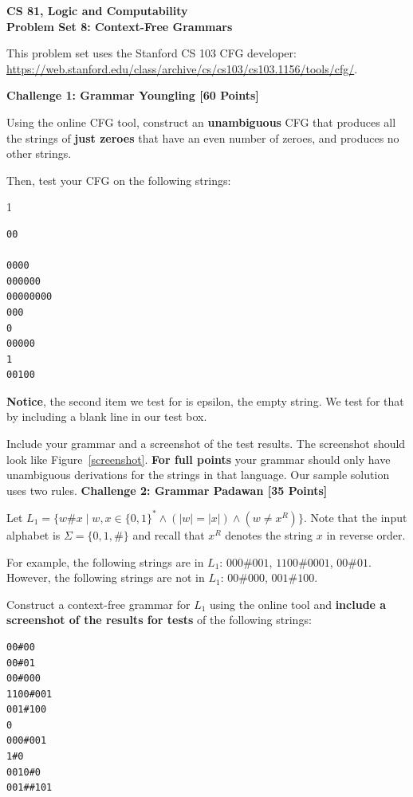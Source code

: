 \documentclass[11pt]{article}
\newcommand{\Problem}[3]{\mbox{} \newline \noindent \textbf{\textbf{Challenge #1: #2 [#3 Points] \\ }}}
\begin{document}
\begin{center}
	\bf
	CS 81, Logic and Computability \\
	Problem Set 8: Context-Free Grammars \\
\end{center}

This problem set uses the Stanford CS 103 CFG developer:\\
\href{https://web.stanford.edu/class/archive/cs/cs103/cs103.1156/tools/cfg/}{https://web.stanford.edu/class/archive/cs/cs103/cs103.1156/tools/cfg/}.

\Problem{1}{Grammar Youngling}{60}

Using the online CFG tool, construct an \textbf{unambiguous} CFG that produces all the strings of \textbf{just zeroes} that have an even number of zeroes, and produces no other strings.

Then, test your CFG on the following strings:
\begin{tcolorbox}1
\begin{verbatim}
00

0000
000000
00000000
000
0
00000
1
00100
\end{verbatim}
\end{tcolorbox}
\textbf{Notice}, the second item we test for is epsilon, the empty string. We test for that by including a blank line in our test box.

Include your grammar and a screenshot of the test results. The screenshot should look like Figure~\ref{screenshot}.
\textbf{For full points} your grammar should only have unambiguous derivations for the strings in that language. Our sample solution uses two rules.
\Problem{2}{Grammar Padawan}{35}

Let $L_1 = \{ w\# x \mid w, x \in \{0, 1\}^* \wedge  (|w| = |x|) \wedge (w \neq x^R) \}$.  Note that the input alphabet is $\Sigma = \{0, 1, \#\}$ and recall that $x^R$ denotes the string $x$ in reverse order.

For example, the following strings are in $L_1$:  $000\#001$, $1100\#0001$, $00\#01$.  However, the following strings are not in $L_1$:  $00\#000$, $001\#100$. 

Construct a context-free grammar for $L_1$ using the online tool and \textbf{include a screenshot of the results for tests} of the following strings:
\begin{tcolorbox}
\begin{verbatim}
00#00
00#01
00#000
1100#001
001#100
0
000#001
1#0
0010#0
001##101
\end{verbatim}
\end{tcolorbox}
\end{document}
